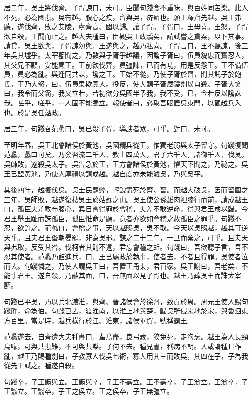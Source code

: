 居二年，吳王將伐齊。子胥諫曰，未可。臣聞句踐食不重味，與百姓同苦樂。此人不死，必為國患。吳有越，腹心之疾，齊與吳，疥癬也。願王釋齊先越。吳王弗聽，遂伐齊，敗之艾陵，虜齊高、國以歸。讓子胥。子胥曰，王毋喜。王怒，子胥欲自殺，王聞而止之。越大夫種曰，臣觀吳王政驕矣，請試嘗之貸粟，以卜其事。請貸，吳王欲與，子胥諫勿與，王遂與之，越乃私喜。子胥言曰，王不聽諫，後三年吳其墟乎。太宰嚭聞之，乃數與子胥爭越議，因讒子胥曰，伍員貌忠而實忍人，其父兄不顧，安能顧王。王前欲伐齊，員彊諫，已而有功，用是反怨王。王不備伍員，員必為亂。與逢同共謀，讒之王。王始不從，乃使子胥於齊，聞其託子於鮑氏，王乃大怒，曰，伍員果欺寡人。役反，使人賜子胥屬鏤劍以自殺。子胥大笑曰，我令而父霸，我又立若，若初欲分吳國半予我，我不受，已，今若反以讒誅我。嗟乎，嗟乎，一人固不能獨立。報使者曰，必取吾眼置吳東門，以觀越兵入也。於是吳任嚭政。

居三年，句踐召范蠡曰，吳已殺子胥，導諛者眾，可乎。對曰，未可。

至明年春，吳王北會諸侯於黃池，吳國精兵從王，惟獨老弱與太子留守。句踐復問范蠡，蠡曰可矣。乃發習流二千人，教士四萬人，君子六千人，諸御千人，伐吳。吳師敗，遂殺吳太子。吳告急於王，王方會諸侯於黃池，懼天下聞之，乃祕之。吳王已盟黃池，乃使人厚禮以請成越。越自度亦未能滅吳，乃與吳平。

其後四年，越復伐吳。吳士民罷弊，輕銳盡死於齊、晉。而越大破吳，因而留圍之三年，吳師敗，越遂復棲吳王於姑蘇之山。吳王使公孫雄肉袒膝行而前，請成越王曰，孤臣夫差敢布腹心，異日嘗得罪於會稽，夫差不敢逆命，得與君王成以歸。今君王舉玉趾而誅孤臣，孤臣惟命是聽，意者亦欲如會稽之赦孤臣之罪乎。句踐不忍，欲許之。范蠡曰，會稽之事，天以越賜吳，吳不取。今天以吳賜越，越其可逆天乎。且夫君王蚤朝晏罷，非為吳邪。謀之二十二年，一旦而棄之，可乎。且夫天與弗取，反受其咎。伐柯者其則不遠，君忘會稽之蚯。句踐曰，吾欲聽子言，吾不忍其使者。范蠡乃鼓進兵，曰，王已屬政於執事，使者去，不者且得罪。吳使者泣而去。句踐憐之，乃使人謂吳王曰，吾置王甬東，君百家。吳王謝曰，吾老矣，不能事君王。遂自殺。乃蔽其面，曰，吾無面以見子胥也。越王乃葬吳王而誅太宰嚭。

句踐已平吳，乃以兵北渡淮，與齊、晉諸侯會於徐州，致貢於周。周元王使人賜句踐胙，命為伯。句踐已去，渡淮南，以淮上地與楚，歸吳所侵宋地於宋，與魯泗東方百里。當是時，越兵橫行於江、淮東，諸侯畢賀，號稱霸王。

范蠡遂去，自齊遺大夫種書曰，蜚鳥盡，良弓藏，狡兔死，走狗烹。越王為人長頸鳥喙，可與共患難，不可與共樂。子何不去。種見書，稱病不朝。人或讒種且作亂，越王乃賜種劍曰，子教寡人伐吳七術，寡人用其三而敗吳，其四在子，子為我從先王試之。種遂自殺。

句踐卒，子王鼫與立。王鼫與卒，子王不壽立。王不壽卒，子王翁立。王翁卒，子王翳立。王翳卒，子王之侯立。王之侯卒，子王無彊立。

